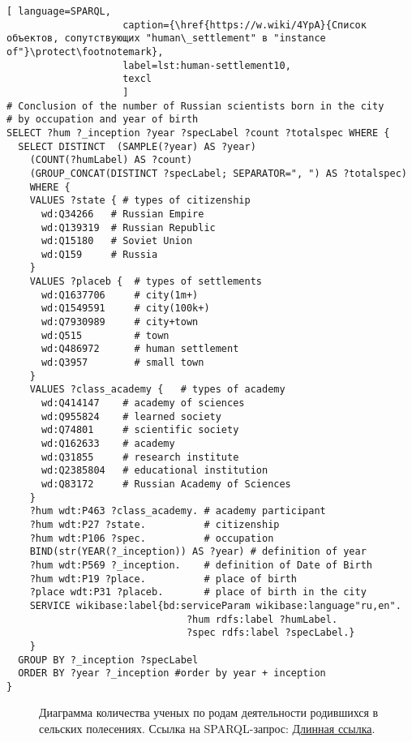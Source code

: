 \lstset{numbers=left, firstnumber=1, frame=single}
\begin{lstlisting}[ language=SPARQL, 
                    caption={\href{https://w.wiki/4YpA}{Cписок объектов, сопутствующих "human\_settlement" в "instance of"}\protect\footnotemark},
                    label=lst:human-settlement10,
                    texcl 
                    ]
# Conclusion of the number of Russian scientists born in the city 
# by occupation and year of birth
SELECT ?hum ?_inception ?year ?specLabel ?count ?totalspec WHERE {
  SELECT DISTINCT  (SAMPLE(?year) AS ?year) 
	(COUNT(?humLabel) AS ?count)  
	(GROUP_CONCAT(DISTINCT ?specLabel; SEPARATOR=", ") AS ?totalspec) 
	WHERE {
    VALUES ?state { # types of citizenship
      wd:Q34266   # Russian Empire 
      wd:Q139319  # Russian Republic
      wd:Q15180   # Soviet Union
      wd:Q159     # Russia
    }
    VALUES ?placeb {  # types of settlements
      wd:Q1637706     # city(1m+)
      wd:Q1549591     # city(100k+)
      wd:Q7930989     # city+town
      wd:Q515         # town
      wd:Q486972      # human settlement
      wd:Q3957        # small town
    }
    VALUES ?class_academy {   # types of academy
      wd:Q414147    # academy of sciences 
      wd:Q955824    # learned society
      wd:Q74801     # scientific society
      wd:Q162633    # academy
      wd:Q31855     # research institute
      wd:Q2385804   # educational institution
      wd:Q83172     # Russian Academy of Sciences
    }
    ?hum wdt:P463 ?class_academy. # academy participant
    ?hum wdt:P27 ?state.          # citizenship
    ?hum wdt:P106 ?spec.          # occupation
    BIND(str(YEAR(?_inception)) AS ?year) # definition of year
    ?hum wdt:P569 ?_inception.    # definition of Date of Birth
    ?hum wdt:P19 ?place.          # place of birth
    ?place wdt:P31 ?placeb.       # place of birth in the city
    SERVICE wikibase:label{bd:serviceParam wikibase:language"ru,en".
                               ?hum rdfs:label ?humLabel.
                               ?spec rdfs:label ?specLabel.}
    }
  GROUP BY ?_inception ?specLabel
  ORDER BY ?year ?_inception #order by year + inception
}
\end{lstlisting}%

\begin{figure*}
    \setlength{\fboxsep}{0pt}%
    \setlength{\fboxrule}{1pt}%
	\label{fig:human-settlement-5}
	\caption[Диаграмма количества ученых по родам деятельности родившихся в сельских полесениях.]{Диаграмма количества ученых по родам деятельности родившихся в сельских полесениях. Ссылка на SPARQL-запрос: \href{}{Длинная ссылка}.}%
\end{figure*} 

